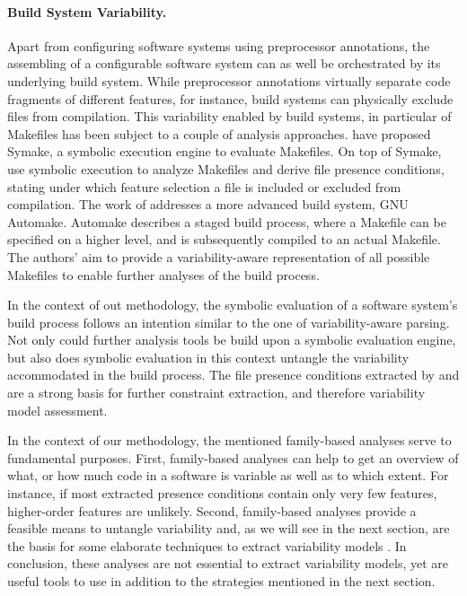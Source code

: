 \paragraph{Build System Variability.} Apart from
configuring software systems using preprocessor annotations, the assembling of
a configurable software system can as well be orchestrated by its underlying
build system. While preprocessor annotations virtually separate code fragments
of different features, for instance, build systems can physically exclude files
from compilation. This variability enabled by build systems, in particular of
Makefiles has been subject to a couple of analysis approaches. \cite{tamrawi_build_2012} have
proposed Symake, a symbolic execution engine to evaluate Makefiles.
On top of Symake, \cite{zhou_extracting_2015} use symbolic execution to analyze
Makefiles and derive file presence conditions, stating under which feature
selection a file is included or excluded from compilation. The work of
\cite{al-kofahi_escaping_2016} addresses a more advanced build system, GNU Automake.
Automake describes a staged build process, where a Makefile can be specified on
a higher level, and is subsequently compiled to an actual Makefile. The
authors’ aim to provide a variability-aware representation of all possible
Makefiles to enable further analyses of the build process.

{\color{gray}
In the context of out methodology, the symbolic evaluation of a software
system’s build process follows an intention similar to the one of
variability-aware parsing. Not only could further analysis tools be build upon
a symbolic evaluation engine, but also does symbolic evaluation in this context
untangle the variability accommodated in the build process. The file presence
conditions extracted by \cite{zhou_extracting_2015}
and \cite{al-kofahi_escaping_2016} are a strong basis for further constraint
extraction, and therefore variability model assessment.\\}

In the context of our methodology, the mentioned family-based analyses serve to
fundamental purposes. First, family-based analyses can help to get an overview
of what, or how much code in a software is variable as well as to which extent.
For instance, if most extracted presence conditions contain only very few
features, higher-order features are unlikely. Second, family-based analyses
provide a feasible means to untangle variability and, as we will see in the
next section, are the basis for some elaborate techniques to extract
variability models \citep{nadi_mining_2014,nadi_where_2015}. In conclusion,
these analyses are not essential to extract variability models, yet are useful tools to use in
addition to the strategies mentioned in the next section.

